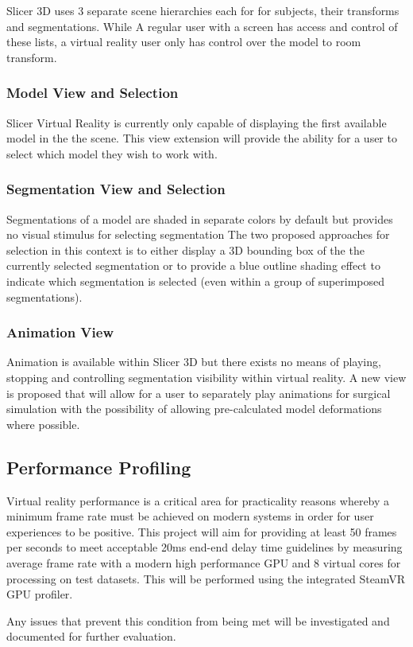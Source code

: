 Slicer 3D uses 3 separate scene hierarchies each for for subjects, their transforms and segmentations. While A regular user with a screen has access and control of these lists, a virtual reality user only has control over the model to room transform.

\subsubsection{Model View and Selection}
Slicer Virtual Reality is currently only capable of displaying the first available model in the the scene. This view extension will provide the ability for a user to select which model they wish to work with.  

\subsubsection{Segmentation View and Selection}
Segmentations of a model are shaded in separate colors by default but provides no visual stimulus for selecting segmentation The two proposed approaches for selection in this context is to either display a 3D bounding box of the the currently selected segmentation or to provide a blue outline shading effect to indicate which segmentation is selected (even within a group of superimposed segmentations). 

\subsubsection{Animation View}
Animation is available within Slicer 3D but there exists no means of playing, stopping and controlling segmentation visibility within virtual reality. A new view is proposed that will allow for a user to separately play animations for surgical simulation with the possibility of allowing pre-calculated model deformations where possible.

\subsection{Performance Profiling}
Virtual reality performance is a critical area for practicality reasons whereby a minimum frame rate must be achieved on modern systems in order for user experiences to be positive. This project will aim for providing at least 50 frames per seconds to meet acceptable 20ms end-end delay time guidelines \cite{Raaen2018} by measuring average frame rate with a modern high performance GPU and 8 virtual cores for processing on test datasets. This will be performed using the integrated SteamVR GPU profiler.

Any issues that prevent this condition from being met will be investigated and documented for further evaluation.


